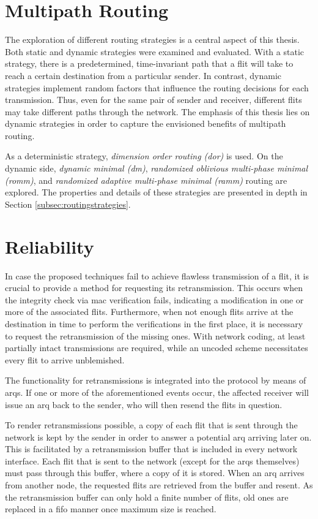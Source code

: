 \section{Multipath Routing}
The exploration of different routing strategies is a central aspect of this thesis. Both static and dynamic strategies were
examined and evaluated. With a static strategy, there is a predetermined, time-invariant path that a flit will take to reach a certain destination
from a particular sender. In contrast, dynamic strategies implement random factors that influence the routing decisions for each
transmission. Thus, even for the same pair of sender and receiver, different flits may take different paths through the network. The emphasis of this
thesis lies on dynamic strategies in order to capture the envisioned benefits of multipath routing.

As a deterministic strategy, \textit{dimension order routing (\gls{dor})} is used. On the dynamic side, \textit{dynamic minimal (\gls{dm})},
\textit{randomized oblivious multi-phase minimal (\gls{romm})}, and \textit{randomized adaptive multi-phase minimal (\gls{ramm})} routing are
explored. The properties and details of these strategies are presented in depth in Section \ref{subsec:routingstrategies}.

\section{Reliability}\label{sec:reliability}
In case the proposed techniques fail to achieve flawless transmission of a flit, it is crucial to provide a method for requesting
its retransmission. This occurs when the integrity check via \gls{mac} verification fails, indicating a modification in one or more of the
associated flits. Furthermore, when not enough flits arrive at the destination in time to perform the verifications in the first place, it is
necessary to request the retransmission of the missing ones. With network coding, at least partially intact transmissions are required, while an
uncoded scheme necessitates every flit to arrive unblemished.

The functionality for retransmissions is integrated into the protocol by means of \glspl{arq}. If one or more of the aforementioned events occur, the affected
receiver will issue an \gls{arq} back to the sender, who will then resend the flits in question.

To render retransmissions possible, a copy of each flit that is sent through the network is kept by the sender in order to answer a potential
\gls{arq} arriving later on. This is facilitated by a retransmission buffer that is included in every network interface. Each flit that is sent to the
network (except for the \glspl{arq} themselves) must pass through this buffer, where a copy of it is stored. When an \gls{arq} arrives from another
node, the requested flits are retrieved from the buffer and resent. As the retransmission buffer can only hold a finite number of flits, old ones are
replaced in a \gls{fifo} manner once maximum size is reached.

